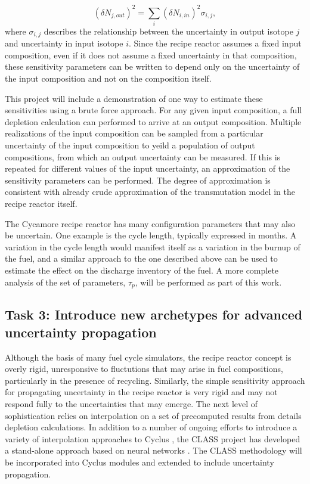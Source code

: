 \documentclass[dvips,12pt]{article}
\newcommand{\unc}[1]
{ \delta #1 }
\newcommand{\uncsq}[1]
{ \left(\unc{#1}\right)^2 }
\begin{document}
\begin{equation}
\uncsq{N_{j,out}} = \sum_i \uncsq{N_{i,in}} \sigma_{i,j},
\end{equation}
where $\sigma_{i,j}$ describes the relationship
between the uncertainty in output isotope $j$ and
uncertainty in input isotope $i$.  Since the
recipe reactor assumes a fixed input composition,
even if it does not assume a fixed uncertainty in
that composition, these sensitivity parameters can
be written to depend only on the uncertainty of
the input composition and not on the composition
itself.  

This project will include a demonstration of one
way to estimate these sensitivities using a brute
force approach.  For any given input composition,
a full depletion calculation can performed to
arrive at an output composition.  Multiple
realizations of the input composition can be
sampled from a particular uncertainty of the input
composition to yeild a population of output
compositions, from which an output uncertainty can
be measured.  If this is repeated for different
values of the input uncertainty, an approximation
of the sensitivity parameters can be performed.
The degree of approximation is consistent with
already crude approximation of the transmutation
model in the recipe reactor itself.

The Cycamore recipe reactor has many configuration
parameters that may also be uncertain.  One
example is the cycle length, typically expressed
in months.  A variation in the cycle length would
manifest itself as a variation in the burnup of
the fuel, and a similar approach to the one
described above can be used to estimate the effect
on the discharge inventory of the fuel.  A more
complete analysis of the set of parameters,
$\tau_p$, will be performed as part of this work.

\subsection{Task 3: Introduce new archetypes for advanced uncertainty propagation}

Although the basis of many fuel cycle simulators,
the recipe reactor concept is overly rigid,
unresponsive to fluctutions that may arise in fuel
compositions, particularly in the presence of
recycling.  Similarly, the simple sensitivity
approach for propagating uncertainty in the recipe
reactor is very rigid and may not respond fully to
the uncertainties that may emerge.  The next level
of sophistication relies on interpolation on a set
of precomputed results from details depletion
calculations.  In addition to a number of ongoing
efforts to introduce a variety of interpolation
approaches to Cyclus \cite{britelite, cyborg}, the
CLASS project\cite{CLASS} has developed a
stand-alone approach based on neural networks \cite{Leniau.ANE.2015}. The
CLASS methodology will be incorporated into Cyclus
modules and extended to include uncertainty
propagation.
\end{document}
